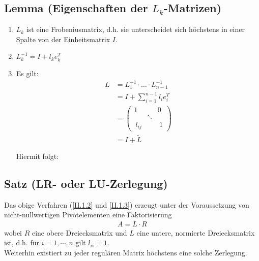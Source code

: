 \documentclass[ngerman,fontsize=11pt, paper=a4, parskip=half, titlepage=true, toc=bib]{scrbook}
\begin{document}
\subsection{Lemma (Eigenschaften der $L_k$-Matrizen)} \label{2.1.12} 
\begin{enumerate}[1.]
\item $L_k$ ist eine Frobeniusmatrix, d.h. sie unterscheidet sich höchstens
  in einer Spalte von der Einheitsmatrix $I$.
\item $L_k^{-1} = I + l_ke_{k}^T$
\item Es gilt:
  \begin{align}
    L &= L_1^{-1} \cdot \dotsc \cdot L_{n-1}^{-1}  
        \label{II.1.13}
    \\ \nonumber
      & = I + \sum_{i=1}^{n-1} l_i e_i^T \\ \nonumber
      &= \begin{pmatrix}
        1 && 0 ~ \\
        &\ddots& \\
        ~l_{ij} && ~1
      \end{pmatrix} \\ \nonumber
      &= I+ \widetilde{L}
  \end{align}
  
  Hiermit folgt: 
\end{enumerate}

\subsection{Satz (LR- oder LU-Zerlegung)} 
Das obige Verfahren (\eqref{II.1.2} und \eqref{II.1.3}) erzeugt unter der Voraussetzung
von nicht-nullwertigen Pivotelementen eine Faktorisierung
\begin{align*}
  A= L\cdot R 
\end{align*}
wobei $R$ eine obere Dreiecksmatrix und $L$ eine untere, normierte Dreiecksmatrix ist,
d.h. für $i=1, \cdots , n$ gilt $l_{ii}= 1$. \\
Weiterhin existiert zu jeder regulären Matrix höchstens eine solche Zerlegung.
\end{document}
